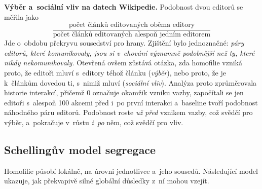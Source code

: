 \documentclass[11pt,a4paper]{article}
\theoremstyle{definition}
\begin{document}
\textbf{Výběr a~sociální vliv na datech Wikipedie.} Podobnost dvou editorů se měřila jako
\[ \frac{\text{počet článků editovaných oběma editory}}
   {\text{počet článků editovaných alespoň jedním editorem}} \]
Jde o~obdobu překryvu sousedství pro hrany. Zjištění bylo jednoznačné: \emph{páry editorů,
které komunikovaly, jsou si v~chování významně podobnější než ty, které nikdy nekomunikovaly.}
Otevřená ovšem zůstává otázka, zda homofilie vzniká proto, že editoři mluví s~editory téhož
článku (\emph{výběr}), nebo proto, že je k~článkům dovedou ti, s~nimiž mluví (\emph{sociální
vliv}). Analýza proto zprůměrovala historie interakcí, přičemž 0 označuje okamžik vzniku vazby,
započítali se jen editoři s~alespoň 100 akcemi před i~po první interakci a~baseline tvoří
podobnost náhodného páru editorů. Podobnost roste \emph{už před} vznikem vazby, což svědčí pro
výběr, a~pokračuje v~růstu \emph{i~po} něm, což svědčí pro vliv.

\subsection{Schellingův model segregace}

Homofilie působí lokálně, na úrovni jednotlivce a~jeho sousedů. Následující model ukazuje, jak
překvapivě silné globální důsledky z~ní mohou vzejít.
\end{document}
